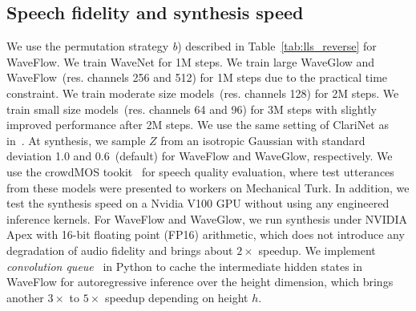 \documentclass{article}
\begin{document}
\subsection{Speech fidelity and synthesis speed}
\vspace{-.1em}
We use the permutation strategy \emph{b}) described in Table~\ref{tab:lls_reverse} for WaveFlow.
We train WaveNet for 1M steps.
We train large WaveGlow and WaveFlow~(res. channels 256 and 512) for 1M steps due to the practical time constraint.
We train moderate size models~(res. channels 128) for 2M steps.
We train small size models~(res. channels 64 and 96) for 3M steps with slightly improved performance after 2M steps.
We use the same setting of ClariNet as in~\citet{ping2018clarinet}.
At synthesis, we sample $Z$ from an isotropic Gaussian with standard deviation 1.0 and 0.6~(default) for WaveFlow and WaveGlow, respectively.
We use the crowdMOS tookit~\citep{ribeiro2011crowdmos} for speech quality evaluation, where test utterances from these models were presented to workers on Mechanical Turk. 
In addition, we test the synthesis speed on a Nvidia V100 GPU without using any engineered inference kernels. 
For WaveFlow and WaveGlow, we run synthesis under NVIDIA Apex with 16-bit floating point (FP16) arithmetic, which does not introduce any degradation of audio fidelity and brings about $2\times$ speedup. 
We implement \emph{convolution queue}~\citep{paine2016fast} in Python to cache the intermediate hidden states in WaveFlow for autoregressive inference over the height dimension, which brings another  $3\times$ to $5\times$ speedup depending on height $h$. 
\end{document}
